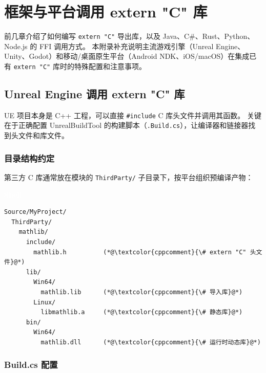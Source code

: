 \documentclass[12pt,a4paper,fontset=fandol]{ctexbook}
\newcommand{\bashlabel}{%
  \begin{tcolorbox}[enhanced,colback=black!80,colframe=black!80,
    arc=1mm,boxrule=0mm,left=6pt,right=6pt,top=2pt,bottom=2pt,
    halign=left,oversize]
    \textcolor{white}{\small\bfseries Shell}
  \end{tcolorbox}\vspace{-4pt}}
\newcommand{\cpp}[1]{C++#1}
\begin{document}
\chapter{框架与平台调用 extern "C" 库}

前几章介绍了如何编写 \texttt{extern "C"} 导出库，以及 Java、C\#、Rust、Python、Node.js 的 FFI 调用方式。
本附录补充说明主流游戏引擎（Unreal Engine、Unity、Godot）和移动/桌面原生平台（Android NDK、iOS/macOS）在集成已有 \texttt{extern "C"} 库时的特殊配置和注意事项。

\section{Unreal Engine 调用 extern "C" 库}

UE 项目本身是 \cpp{} 工程，可以直接 \texttt{\#include} C 库头文件并调用其函数。
关键在于正确配置 UnrealBuildTool 的构建脚本（\texttt{.Build.cs}），让编译器和链接器找到头文件和库文件。

\subsection{目录结构约定}

第三方 C 库通常放在模块的 \texttt{ThirdParty/} 子目录下，按平台组织预编译产物：

\bashlabel
\begin{lstlisting}[style=bashstyle]
Source/MyProject/
  ThirdParty/
    mathlib/
      include/
        mathlib.h          (*@\textcolor{cppcomment}{\# extern "C" 头文件}@*)
      lib/
        Win64/
          mathlib.lib      (*@\textcolor{cppcomment}{\# 导入库}@*)
        Linux/
          libmathlib.a     (*@\textcolor{cppcomment}{\# 静态库}@*)
      bin/
        Win64/
          mathlib.dll      (*@\textcolor{cppcomment}{\# 运行时动态库}@*)
\end{lstlisting}

\subsection{Build.cs 配置}
\end{document}

